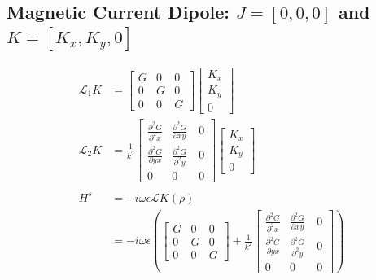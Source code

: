 \documentclass{article}
\newcommand{\0}{\varnothing}
\begin{document}
\subsection{Magnetic Current Dipole: $J = [0,0,0]$ and $K = [K_x,K_y,0]$}
\begin{minipage}{0.5\textwidth}
\begin{align*}
	\mathcal{L}_1 K &= 
    \left[ \begin{array}{ccc} G & 0 & 0 \\ 
                            0 & G & 0\\ 
                            0 & 0 & G \end{array} \right]
        \left[ \begin{array}{c} 
        K_x \\ K_y \\ 0 \end{array} \right]\\
	\mathcal{L}_2 K &= \frac{1}{k^2} \left[ \begin{array}{ccc} \frac{\partial^2 G }{\partial^2 x} & \frac{\partial^2 G }{\partial xy}\ & 0 \\ 
                            \frac{\partial^2 G}{\partial yx} & \frac{\partial^2 G}{\partial^2 y} &0\\ 
                            0 & 0 &0 \end{array} \right]
                                    \left[ \begin{array}{c} 
					        K_x \\ K_y \\ 0 \end{array} \right]\\
	\ \\
	H^s &= -i\omega\epsilon \mathcal{L} K (\rho) \\ &=-i\omega\epsilon 
	\left( \left[ \begin{array}{ccc} G & 0 & 0 \\ 
                            0 & G & 0\\ 
                            0 & 0 & G \end{array} \right] + \frac{1}{k^2} \left[ \begin{array}{ccc} \frac{\partial^2 G }{\partial^2 x} & \frac{\partial^2 G }{\partial xy}\ & 0 \\ 
                            \frac{\partial^2 G}{\partial yx} & \frac{\partial^2 G}{\partial^2 y} &0\\ 
                            0 & 0 &0 \end{array} \right] \right)

\end{align*}
\end{minipage}
\end{document}
